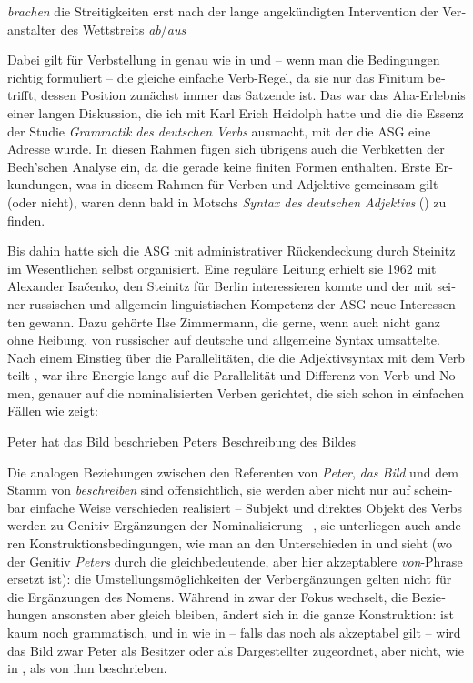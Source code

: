 \documentclass[output=paper,colorlinks,citecolor=brown]{langscibook}
\begin{document}
\begin{otherlanguage}{german}
\ea \textit{brachen} die Streitigkeiten erst nach der lange angekündigten Intervention der Veranstalter des Wettstreits \textit{ab}/\textit{aus}
\label{ex:5}
\z

\noindent Dabei gilt für Verbstellung in  genau wie in  und  -- wenn man die Bedingungen richtig formuliert -- die gleiche einfache Verb-Regel, da sie nur das Finitum betrifft, dessen Position zunächst immer das Satzende ist. Das war das Aha-Erlebnis einer langen Diskussion, die ich mit Karl Erich Heidolph hatte und die die Essenz der Studie \textit{Grammatik des deutschen Verbs} \citep{Bierwisch1963} ausmacht, mit der die ASG eine Adresse wurde. In diesen Rahmen fügen sich übrigens auch die Verbketten der Bech'schen Analyse ein, da die gerade keine finiten Formen enthalten. Erste Erkundungen, was in diesem Rahmen für Verben und Adjektive gemeinsam gilt (oder nicht), waren denn bald in Motschs \textit{Syntax des deutschen Adjektivs} (\citeyear{Motsch1964}) zu finden.

\label{sec:2}

Bis dahin hatte sich die ASG mit administrativer Rückendeckung durch Steinitz im Wesentlichen selbst organisiert. Eine reguläre Leitung erhielt sie 1962 mit Alexander Isačenko, den Steinitz für Berlin interessieren konnte und der mit seiner russischen und allgemein-linguistischen Kompetenz der ASG neue In\-te\-res\-sen\-ten gewann. Dazu gehörte Ilse Zimmermann, die gerne, wenn auch nicht ganz ohne Reibung, von russischer auf deutsche und allgemeine Syntax umsattelte. Nach einem Einstieg über die Parallelitäten, die die Adjektivsyntax mit dem Verb teilt \citep{Zimmermann1967}, war ihre Energie lange auf die Parallelität und Differenz von Verb und Nomen, genauer auf die nominalisierten Verben gerichtet, die sich schon in einfachen Fällen wie  zeigt:

\ea
\ea Peter hat das Bild beschrieben
\ex Peters Beschreibung des Bildes
\z
\label{ex:6}
\z

\noindent Die analogen Beziehungen zwischen den Referenten von \textit{Peter}, \textit{das Bild} und dem Stamm von \textit{beschreiben} sind offensichtlich, sie werden aber nicht nur auf scheinbar einfache Weise verschieden realisiert -- Subjekt und direktes Objekt des Verbs werden zu Genitiv-Ergänzungen der Nominalisierung --, sie unterliegen auch anderen Konstruktionsbedingungen, wie man an den Unterschieden in  und  sieht (wo der Genitiv \textit{Peters} durch die gleichbedeutende, aber hier akzeptablere \textit{von}-Phrase ersetzt ist): die Umstellungsmöglichkeiten der Verbergänzungen gelten nicht für die Ergänzungen des Nomens. Während in  zwar der Fokus wechselt, die Beziehungen ansonsten aber gleich bleiben, ändert sich in  die ganze Konstruktion:  ist kaum noch grammatisch, und in  wie in  -- falls das noch als akzeptabel gilt -- wird das Bild zwar Peter als Besitzer oder als Dargestellter zugeordnet, aber nicht, wie in , als von ihm beschrieben.


\end{otherlanguage}
\end{document}
